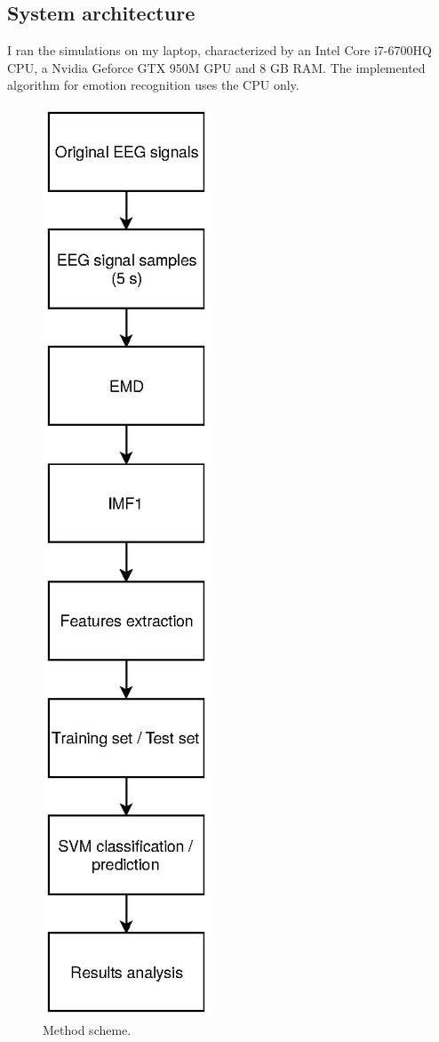 \documentclass[10pt,journal,A4paper,compsoc,epsfig]{IEEEtran}
\begin{document}
\subsection{System architecture}
\label{arch}
I ran the simulations on my laptop, characterized by an Intel Core i7-6700HQ CPU, a Nvidia Geforce GTX 950M GPU and 8 GB RAM. The implemented algorithm for emotion recognition uses the CPU only.

\begin{figure}
\centering
\includegraphics[scale=0.6, trim=0 7cm 15cm 2cm, center]{./Fig/scheme.eps}
\caption{Method scheme.}
\label{Fig:scheme}
\end{figure}
\end{document}

